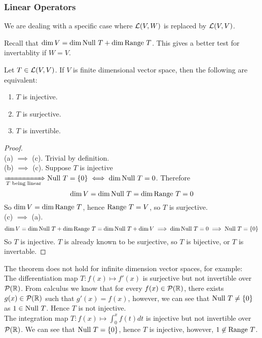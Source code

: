 \subsubsection{Linear Operators}
We are dealing with a specific case where $\mathcal L(V,W)$ is replaced by $\mathcal L(V,V)$.
\begin{center}
\end{center}
Recall that $\dim V = \dim \text{Null } T + \dim \text{Range } T$. This gives a better test for invertablity if $W  = V$. 
\begin{theorem}
    Let $T \in \mathcal L(V,V)$. If $V$ is finite dimensional vector space, then the following are equivalent: 
    \begin{enumerate}[label = (\alph*)]
        \item $T$ is injective.
        \item $T$ is surjective.
        \item $T$ is invertible.
    \end{enumerate}
\end{theorem}
\begin{proof} $ $ \\
    (a) $\implies$ (c). Trivial by definition. \\
    (b) $\implies$ (c). Suppose $T$ is injective $\xRightarrow[T \text{ being linear}]{} \text{Null } T = \left\{ 0 \right\} \iff \dim \text{Null } T = 0$. Therefore 
    \[ \dim V = \dim \text{Null } T = \dim \text{Range } T = 0\] So $\dim V = \dim \text{Range } T$, hence $\text{Range } T = V$, so $T$ is surjective. \\
    (c) $\implies$ (a).  \[\dim V = \dim \text{Null } T + \dim \text{Range } T = \dim \text{Null } T + \dim V \implies \dim \text{Null } T  = 0 \implies \text{Null } T = \left\{0\right\}\] So $T$ is injective. $T$ is already known to be surjective, so $T$ is bijective, or $T$ is invertable.
\end{proof}
\begin{example}
    The theorem does not hold for infinite dimension vector spaces, for example: \\ 
    The differentiation map $T : f(x) \mapsto f'(x)$ is surjective but not invertible over $\mathcal P(\mathbb R)$.  From calculus we know that for every $f(x) \in \mathcal P(\mathbb R)$, there exists $g(x) \in \mathcal P(\mathbb R)$ such that $g'(x) = f(x)$, however, we can see that $\text{Null } T \neq \left\{ 0 \right\}$ as $1 \in
    \text{Null } T$. Hence $T$ is not injective. \\
    The integration map $\displaystyle T: f(x) \mapsto \int_0^x f(t) dt$ is injective but not invertible over $\mathcal P(\mathbb R)$. We can see that $\text{Null } T = \left\{ 0 \right\}$, hence $T$ is injective, however, $1 \not\in \text{Range } T$.
\end{example}
